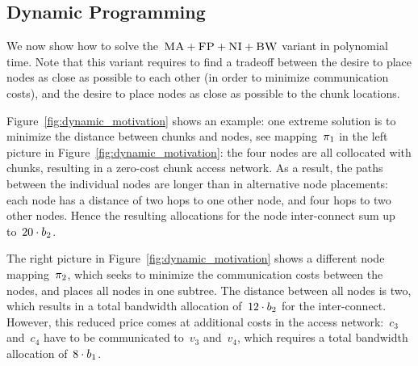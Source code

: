 \subsection{Dynamic Programming}\label{ssec:dyn}

We now show how to solve the~$\textsc{MA}+\textsc{FP}+\textsc{NI}+\textsc{BW}$ variant
in polynomial time.
Note that this variant requires to find a
tradeoff between the desire to place nodes as close as possible to each other
(in order to minimize communication costs), and the desire to place nodes
as close as possible to
the chunk locations.




 Figure~\ref{fig:dynamic_motivation} shows an example: one
extreme solution is to minimize the distance between chunks and nodes,
see mapping~$\pi_1$ in the left picture in
Figure~\ref{fig:dynamic_motivation}: the four nodes are all
collocated with chunks, resulting in a zero-cost chunk access network. As a
result, the paths between the individual nodes are longer than in alternative
node placements: each node has a distance of two hops to one other node,
and four hops to two other nodes. Hence the resulting allocations for the
node inter-connect sum up to~$20 \cdot b_2$.


The right picture in Figure~\ref{fig:dynamic_motivation} shows a different node
mapping~$\pi_2$, which seeks to minimize the communication costs
between the nodes, and places all nodes in one subtree. The distance between all
nodes is two, which results in a total bandwidth allocation of~$12\cdot b_2$
for the inter-connect. However, this reduced price comes at additional costs in
the access network:~$c_3$ and~$c_4$ have to be communicated to~$v_3$ and~$v_4$,
which requires a total bandwidth allocation of~$8 \cdot b_1$.


